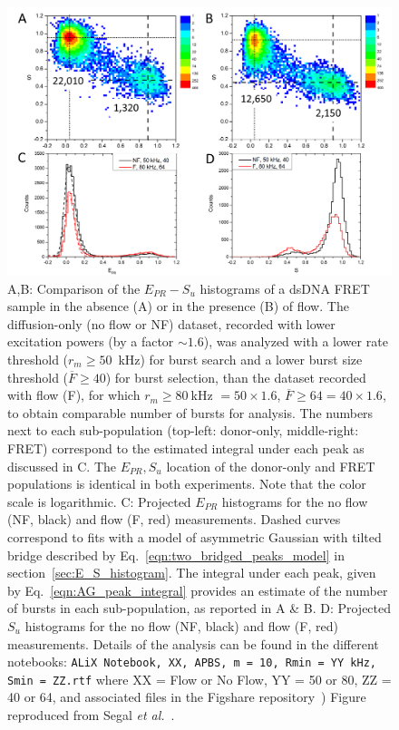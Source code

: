 \begin{figure}
\centering\includegraphics[width=\textwidth]{chapters/figures/ES_flow_noflow_comparison.png}
\caption{\label{fig:ES_flow_noflow_comparison} 
A,B: Comparison of the $E_{PR}-S_u$ histograms
of a dsDNA FRET sample in the absence (A) or in the presence (B) of flow.
The diffusion-only (no flow or NF) dataset, recorded with lower excitation powers (by a factor $\sim1.6$), was analyzed with a lower rate threshold ($r_m \geq 50$~kHz) for burst search and a lower burst size threshold ($\overline{F} \geq 40$) for burst selection, than the dataset recorded with flow (F), for which $r_m \geq 80~$kHz $= 50 \times 1.6$, $\overline{F} \geq 64 = 40 \times 1.6$, to obtain comparable number of bursts for analysis.
The numbers next to each sub-population (top-left: donor-only, middle-right: FRET) correspond to the estimated integral under each peak as discussed in C. The $E_{PR},S_u$ location of the donor-only and FRET populations is identical in both experiments. 
Note that the color scale is logarithmic.
C: Projected $E_{PR}$ histograms for the no flow (NF, black) and flow (F, red) measurements. 
Dashed curves correspond to fits with a model of asymmetric Gaussian with tilted bridge described by Eq.~\ref{eqn:two_bridged_peaks_model} in section~\ref{sec:E_S_histogram}. 
The integral under each peak, given by Eq.~\ref{eqn:AG_peak_integral} provides an estimate of the number of bursts in each sub-population, as reported in A \& B.
D: Projected $S_u$ histograms for the no flow (NF, black) and flow (F, red) measurements.
Details of the analysis can be found in the different notebooks:
\texttt{ALiX Notebook, XX, APBS, m = 10, Rmin = YY kHz, Smin = ZZ.rtf} where XX = Flow or No Flow,
YY = 50 or 80, ZZ = 40 or 64, and associated files in the Figshare repository~\cite{figshare_repo_2019})
Figure reproduced from Segal \textit{et al.}~\cite{segal_methods_2019}.
}
\end{figure}

